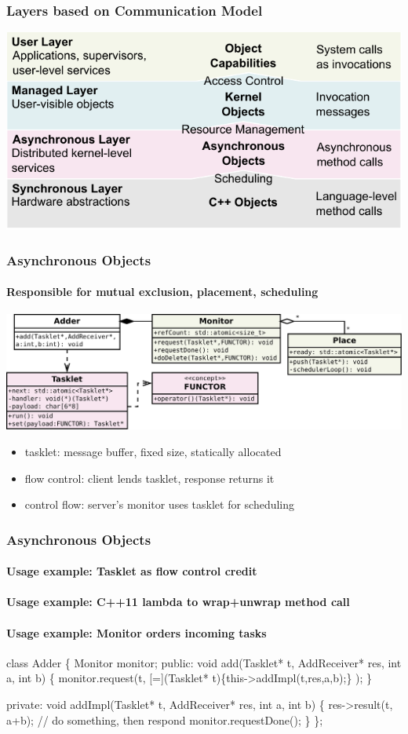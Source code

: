 \documentclass[9pt]{beamer}
\begin{document}
\begin{frame}
  \frametitle{Layers based on Communication Model}
  \includegraphics[width=\textwidth]{figures/layers.pdf}
\end{frame}

\begin{frame}
  \frametitle{Asynchronous Objects}
  \framesubtitle{Responsible for mutual exclusion, placement, scheduling}

  \includegraphics[width=\textwidth]{figures/tasklet-class.pdf}
  \vfill

  \begin{itemize}
  \item tasklet: message buffer, fixed size, statically allocated
  \item flow control: client lends tasklet, response returns it
  \item control flow: server's monitor uses tasklet for scheduling
  \end{itemize}
\end{frame}

\begin{frame}[fragile]
  \frametitle{Asynchronous Objects}
  \framesubtitle<1>{Usage example: Tasklet as flow control credit}
  \framesubtitle<2>{Usage example: C++11 lambda to wrap+unwrap method call}
  \framesubtitle<3>{Usage example: Monitor orders incoming tasks}

  \begin{semiverbatim}
class Adder \{
  \alert<3>{Monitor monitor};
public:
  void add(\alert<1>{Tasklet* t}, AddReceiver* res, int a, int b) \{
    \alert<3>{monitor.request}(\alert<1>{t}, 
            \alert<2>{[=](\alert<1>{Tasklet* t})\{this->addImpl(\alert<1>{t},res,a,b);\}} );
  \}

private:
  \alert<2>{void addImpl}(\alert<1>{Tasklet* t}, AddReceiver* res, int a, int b) \{
    res->result(\alert<1>{t}, a+b);   // do something, then respond
    \alert<3>{monitor.requestDone}();
  \}
\};
  \end{semiverbatim}
\end{frame}
\end{document}
